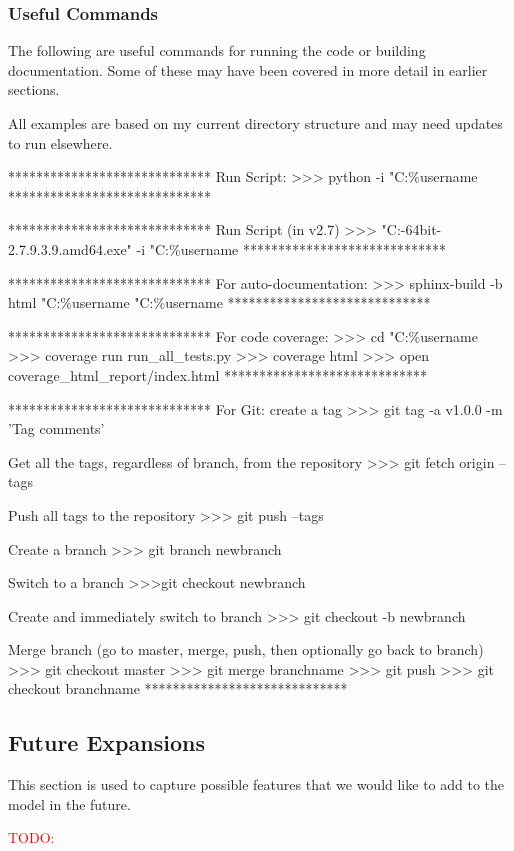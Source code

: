 \documentclass[12pt]{article}
\begin{document}
\subsubsection{Useful Commands}\label{h3:useful_commands}
The following are useful commands for running the code or building documentation.  Some of these may have been covered in more detail in earlier sections.

\begin{PlainText}
All examples are based on my current directory structure and may need updates to run elsewhere.


*****************************
Run Script:
>>> python -i "C:\Users\%username%
*****************************


*****************************
Run Script (in v2.7)
>>> "C:\Programs\WinPython-64bit-2.7.9.3.9.amd64\python.exe"
 -i "C:\Users\%username%
*****************************


*****************************
For auto-documentation:
>>> sphinx-build -b html "C:\Users\%username%
 "C:\Users\%username%
*****************************


*****************************
For code coverage:
>>> cd "C:\Users\%username%
>>> coverage run run_all_tests.py
>>> coverage html
>>> open coverage_html_report/index.html
*****************************

*****************************
For Git:
create a tag
>>> git tag -a v1.0.0 -m 'Tag comments'

Get all the tags, regardless of branch, from the repository
>>> git fetch origin --tags

Push all tags to the repository
>>> git push --tags

Create a branch
>>> git branch newbranch

Switch to a branch
>>>git checkout newbranch

Create and immediately switch to branch
>>> git checkout -b newbranch

Merge branch (go to master, merge, push, then optionally go back to branch)
>>> git checkout master
>>> git merge branchname
>>> git push
>>> git checkout branchname
*****************************
\end{PlainText}

\subsection{Future Expansions}\label{h2:Future_expansions}
This section is used to capture possible features that we would like to add to the model in the future.

\textcolor{red}{TODO:}
\end{document}
